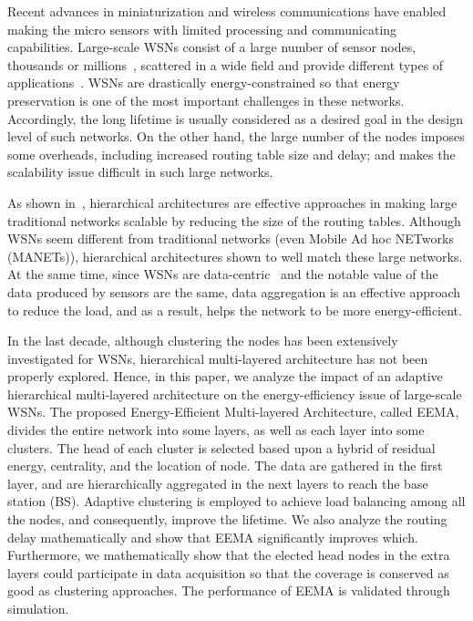 \documentclass[journal]{IEEEtran}
\begin{document}
Recent advances in miniaturization and wireless communications have enabled making the micro sensors with limited processing and communicating capabilities.  Large-scale WSNs consist of a large number of sensor nodes, thousands or millions~\cite{Akyildiz2002}, scattered in a wide field and provide different types of applications~\cite{Yick2008}. WSNs are drastically energy-constrained  so that energy preservation is one of the most important challenges in these networks.
Accordingly, the long lifetime is usually considered as a desired goal in the design level of such networks. On the other hand, the large number of the nodes imposes some overheads, including increased routing table size and delay; and makes the scalability issue difficult in such large networks. 

As shown in~\cite{Kleinrock1977}, hierarchical architectures are effective approaches in making large traditional networks scalable by reducing the  size of the routing tables.  Although WSNs seem different from traditional networks (even Mobile Ad hoc NETworks (MANETs)), hierarchical architectures shown to well match these large networks. At the same time, since WSNs are data-centric~\cite{survey-karaki} and the notable value of the data produced by sensors are the same, data aggregation is an effective approach to reduce the load, and as a result, helps the network to be more energy-efficient.  


In the last decade, although clustering the nodes has been extensively investigated for WSNs, hierarchical multi-layered architecture has not been properly explored.  Hence, in this paper, we analyze the impact of an adaptive hierarchical multi-layered architecture on the energy-efficiency issue of large-scale WSNs. The proposed Energy-Efficient Multi-layered Architecture, called EEMA, divides the entire network into some layers, as well as each layer into some clusters. The head of each cluster is selected based upon a hybrid of residual energy, centrality, and the location of node. The data are gathered in the first layer, and  are hierarchically aggregated in the next layers to reach the base station (BS).  Adaptive clustering is employed to achieve load balancing among all the nodes, and consequently, improve the lifetime.   We also analyze the routing delay mathematically and show that EEMA significantly improves which.  Furthermore, we mathematically show that the elected head nodes in the extra layers could participate in data acquisition so that the coverage is conserved as good as clustering approaches.  The performance of EEMA is validated through simulation.
 
\end{document}
